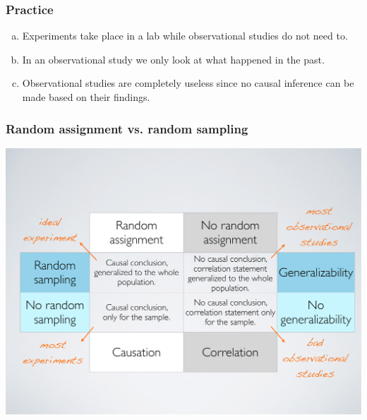 \begin{frame}
\frametitle{Practice}


\begin{enumerate}[(a)]
\item Experiments take place in a lab while observational studies do not need to.
\item In an observational study we only look at what happened in the past.
\item Observational studies are completely useless since no causal inference can be made based on their findings.
\end{enumerate}

\end{frame}


\begin{frame}
\frametitle{Random assignment vs. random sampling}

\begin{center}
\includegraphics[width=\textwidth]{1-5_experiments/figures/random_sample_assignment}
\end{center}

\end{frame}

